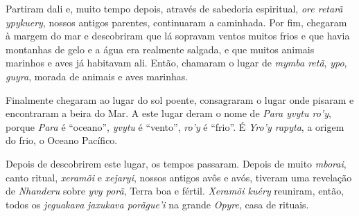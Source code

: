 Partiram dali e, muito tempo depois, através de sabedoria espiritual,
\emph{ore retarã ypykuery}, nossos antigos parentes, continuaram a
caminhada. Por fim, chegaram à margem do mar e descobriram que lá
sopravam ventos muitos frios e que havia montanhas de gelo e a água era
realmente salgada, e que muitos animais marinhos e aves já habitavam
ali. Então, chamaram o lugar de \emph{mymba retã}, \emph{ypo},
\emph{guyra}, morada de animais e aves marinhas.

Finalmente chegaram ao lugar do sol poente, consagraram o lugar onde
pisaram e encontraram a beira do Mar. A este lugar deram o nome de
\emph{Para yvytu ro'y}, porque \emph{Para} é ``oceano'', \emph{yvytu} é
``vento'', \emph{ro'y} é ``frio''. É \emph{Yro'y rapyta}, a origem do
frio, o Oceano Pacífico.


 

Depois de descobrirem este lugar, os tempos passaram. Depois de muito
\emph{mborai}, canto ritual, \emph{xeramõi} e \emph{xejaryi}, nossos
antigos avôs e avós, tiveram uma revelação de \emph{Nhanderu} sobre
\emph{yvy porã}, Terra boa e fértil. \emph{Xeramõi kuéry} reuniram,
então, todos os \emph{jeguakava} \emph{jaxukava porãgue'i} na grande
\emph{Opyre}, casa de rituais.

 

 
